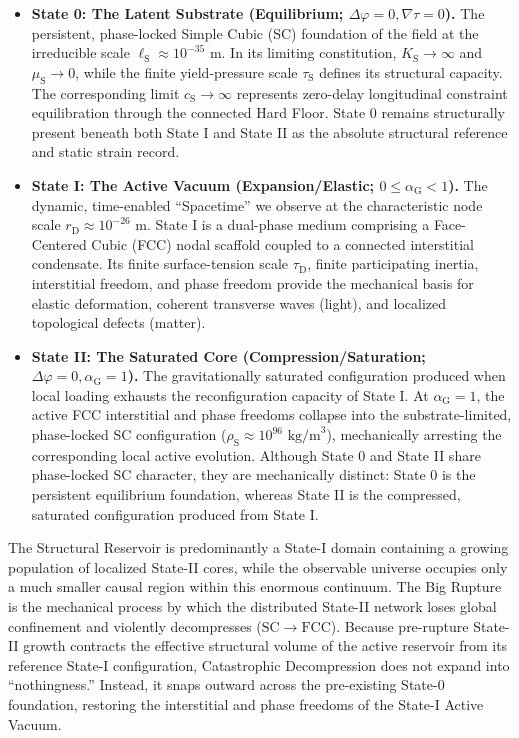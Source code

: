 \begin{itemize}
    \item \textbf{State 0: The Latent Substrate (Equilibrium; $\Delta\varphi = 0, \nabla\tau = 0$).}
    The persistent, phase-locked Simple Cubic (SC) foundation of the field at the irreducible scale $\ell_{\mathrm{S}} \approx 10^{-35}\text{ m}$. In its limiting constitution, $K_{\mathrm{S}} \to \infty$ and $\mu_{\mathrm{S}} \to 0$, while the finite yield-pressure scale $\tau_{\mathrm{S}}$ defines its structural capacity. The corresponding limit $c_{\mathrm{S}} \to \infty$ represents zero-delay longitudinal constraint equilibration through the connected Hard Floor. State 0 remains structurally present beneath both State I and State II as the absolute structural reference and static strain record.

    \item \textbf{State I: The Active Vacuum (Expansion/Elastic; $0 \le \alpha_{\mathrm{G}} < 1$).}
    The dynamic, time-enabled ``Spacetime'' we observe at the characteristic node scale $r_{\mathrm{D}} \approx 10^{-26}\text{ m}$. State I is a dual-phase medium comprising a Face-Centered Cubic (FCC) nodal scaffold coupled to a connected interstitial condensate. Its finite surface-tension scale $\tau_{\mathrm{D}}$, finite participating inertia, interstitial freedom, and phase freedom provide the mechanical basis for elastic deformation, coherent transverse waves (light), and localized topological defects (matter).

    \item \textbf{State II: The Saturated Core (Compression/Saturation; $\Delta\varphi = 0, \alpha_{\mathrm{G}} = 1$).}
    The gravitationally saturated configuration produced when local loading exhausts the reconfiguration capacity of State I. At $\alpha_{\mathrm{G}} = 1$, the active FCC interstitial and phase freedoms collapse into the substrate-limited, phase-locked SC configuration ($\rho_{\mathrm{S}} \approx 10^{96}\text{ kg/m}^3$), mechanically arresting the corresponding local active evolution. Although State 0 and State II share phase-locked SC character, they are mechanically distinct: State 0 is the persistent equilibrium foundation, whereas State II is the compressed, saturated configuration produced from State I.
\end{itemize}

The Structural Reservoir is predominantly a State-I domain containing a growing population of localized State-II cores, while the observable universe occupies only a much smaller causal region within this enormous continuum. The Big Rupture is the mechanical process by which the distributed State-II network loses global confinement and violently decompresses ($\mathrm{SC} \longrightarrow \mathrm{FCC}$). Because pre-rupture State-II growth contracts the effective structural volume of the active reservoir from its reference State-I configuration, Catastrophic Decompression does not expand into ``nothingness.'' Instead, it snaps outward across the pre-existing State-0 foundation, restoring the interstitial and phase freedoms of the State-I Active Vacuum.

